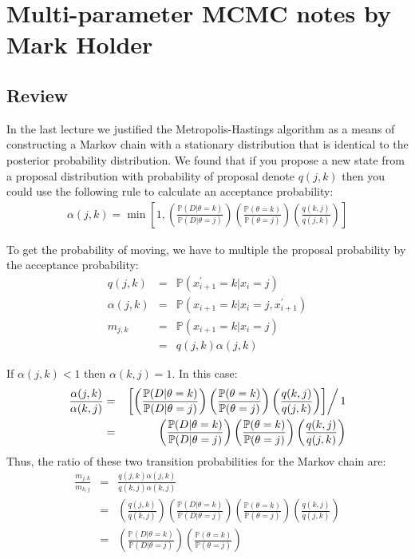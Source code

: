 \documentclass[11pt]{article}
\newcommand{\prop}[2]{q(#1,#2)}
\newcommand{\accept}[2]{\alpha({#1,#2})}
\renewcommand{\Pr}{{\mathbb P}}
\begin{document}

\section*{Multi-parameter MCMC notes by Mark Holder}
\subsection*{Review}
In the last lecture we justified the Metropolis-Hastings algorithm as a means of constructing a Markov chain with a stationary distribution that is identical to the posterior probability distribution.
We found that if you propose a new state from a proposal distribution with probability of proposal denote $\prop{j}{k}$ then you could use the following rule to calculate an acceptance probability:
\begin{eqnarray*}
	\accept{j}{k} = \min\left[1, \left(\frac{\Pr(D|\theta=k)}{\Pr(D|\theta=j)}\right)\left(\frac{\Pr(\theta=k)}{\Pr(\theta=j)}\right)\left(\frac{\prop{k}{j}}{\prop{j}{k}}\right)\right]
\end{eqnarray*}

To get the probability of moving, we have to multiple the proposal probability by the acceptance probability:
\begin{eqnarray*}
	\prop{j}{k} & = & \Pr(x_{i+1}^{\prime}=k|x_i = j) \\
	\accept{j}{k}  & = & \Pr(x_{i+1}=k|x_i = j,x_{i+1}^{\prime}) \\
	m_{j,k} & = & \Pr(x_{i+1}=k|x_i = j) \\
		 & = & \prop{j}{k}\accept{j}{k}
\end{eqnarray*}

If $\accept{j}{k} < 1$ then $\accept{k}{j} = 1$.  
In this case:
\begin{eqnarray*}
	\frac{\accept{j}{k}}{\accept{k}{j}} & = & \left.\left[\left(\frac{\Pr(D|\theta=k)}{\Pr(D|\theta=j)}\right)\left(\frac{\Pr(\theta=k)}{\Pr(\theta=j)}\right)\left(\frac{\prop{k}{j}}{\prop{j}{k}}\right)\right]\right/1 \\
	& = & \left(\frac{\Pr(D|\theta=k)}{\Pr(D|\theta=j)}\right)\left(\frac{\Pr(\theta=k)}{\Pr(\theta=j)}\right)\left(\frac{\prop{k}{j}}{\prop{j}{k}}\right)
\end{eqnarray*}
Thus, the ratio of these two transition probabilities for the Markov chain are:
\begin{eqnarray*}
	\frac{m_{j,k}}{m_{k,j}} & = & \frac{\prop{j}{k}\accept{j}{k}}{\prop{k}{j}\accept{k}{j}} \\
		& = & \left(\frac{\prop{j}{k}}{\prop{k}{j}}\right)\left(\frac{\Pr(D|\theta=k)}{\Pr(D|\theta=j)}\right)\left(\frac{\Pr(\theta=k)}{\Pr(\theta=j)}\right)\left(\frac{\prop{k}{j}}{\prop{j}{k}}\right) \\
		& = & \left(\frac{\Pr(D|\theta=k)}{\Pr(D|\theta=j)}\right)\left(\frac{\Pr(\theta=k)}{\Pr(\theta=j)}\right)
\end{eqnarray*}
\end{document}
